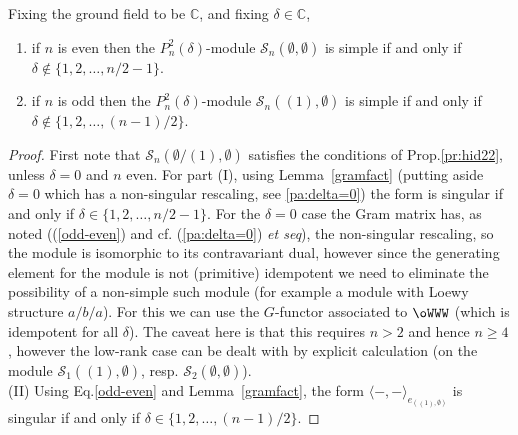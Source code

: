 \documentclass[reqno,10pt,a4paper]{amsart}
\newcommand{\C}{\mathbb{C}}
\newcommand{\blue}[1]{\textcolor{blue}{#1}}
\newcommand{\red}[1]{\textcolor{red}{#1}}
\newcommand{\ppm}[1]{\red{#1}}
\newcommand{\ppmm}[1]{{#1}}
\newcommand{\ca}[1]{\blue{#1}}
\newcommand{\nk}{n}  %
\newcommand{\cell}{\mathcal{S}}
\begin{document}
\begin{prop}\label{simpS}
Fixing the ground field to be $\C$, \ppmm{and fixing $\delta \in \C$,}
\begin{enumerate}
    \item[(I)] if $n$ is even then the $P^2_{\nk}(\delta)$-module $\cell_{\nk}(\emptyset,\emptyset)$ is simple if and only if  $\delta\not\in\{ %
1,2,\dots,\nk/2 -1\}$.
\item[(II)] if $n$ is odd then the $P^2_{\nk}(\delta)$-module $\cell_{\nk}({(1)},\emptyset)$ is simple if and only if  $\delta\not\in\{ %
1,2,\dots,(\nk-1)/2\}$.
\end{enumerate}

    \end{prop}
\begin{proof}
First note that $\cell_\nk(\emptyset/{(1)},\emptyset)$ satisfies the conditions of 
   Prop.\ref{pr:hid22}, unless $\delta=0$ and $n$ even. 
For part (I), using Lemma~\ref{gramfact} %
(putting aside $\delta = 0$ which has a non-singular rescaling, see \ref{pa:delta=0})
the form is singular if and only if   $\delta\in\{1,2,\dots,\nk/2 -1\}$.
\ppmm{For the $\delta = 0$ case the Gram matrix has, as noted 
((\ref{odd-even}) and cf. (\ref{pa:delta=0}) {\em{et seq}}), 
the non-singular rescaling, so the module is isomorphic to its contravariant dual, however since the generating element for the module is not (primitive) idempotent we need to eliminate the possibility of a non-simple such module (for example a module with Loewy structure $a/b/a$). For this we can use the $G$-functor associated to $\oWWW$ (which is idempotent for all $\delta$). The caveat here is 
that this requires $n>2$ and hence $n \geq 4$, however the low-rank case can be dealt with by explicit calculation  
(on the module $\cell_{1}({(1)},\emptyset)$, 
resp. $\cell_{2}(\emptyset,\emptyset)$).}
\\ 
(II) Using Eq.\ref{odd-even} and Lemma~\ref{gramfact}, the form 
$\langle-,-\rangle_{e_{((1),\emptyset)}}$ is singular if and only if $\delta\in\{1,2,\dots,(\nk-1)/2\}$.
\end{proof}


\end{document}
